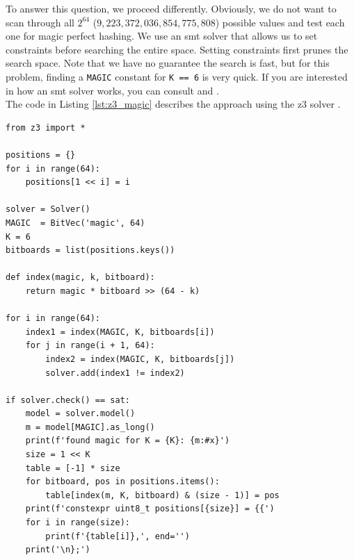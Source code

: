 \documentclass[12pt,a4paper,twoside,openright]{book}
\begin{document}
To answer this question, we proceed differently. Obviously, we do not want to scan through all $2^{64}$ ($9, 223, 372, 036, 854, 775, 808$) possible values and test each one for magic perfect hashing. We use an \gls{smt} solver that allows us to set constraints before searching the entire space. Setting constraints first prunes the search space. Note that we have no guarantee the search is fast, but for this problem, finding a \texttt{MAGIC} constant for \texttt{K == 6} is very quick. If you are interested in how an \gls{smt} solver works, you can consult \cite{kroening2016decision} and \cite{biere2021handbook}.\\

The code in Listing \ref{lst:z3_magic} describes the approach using the \gls{z3} solver \cite{moura2008z3}.

\begin{mdframed}[skipabove=\baselineskip,hidealllines=true]
\begin{verbatim}
from z3 import *

positions = {}
for i in range(64):
    positions[1 << i] = i

solver = Solver()
MAGIC  = BitVec('magic', 64)
K = 6
bitboards = list(positions.keys())

def index(magic, k, bitboard):
    return magic * bitboard >> (64 - k)

for i in range(64):
    index1 = index(MAGIC, K, bitboards[i])
    for j in range(i + 1, 64):
        index2 = index(MAGIC, K, bitboards[j])
        solver.add(index1 != index2)

if solver.check() == sat:
    model = solver.model()
    m = model[MAGIC].as_long()
    print(f'found magic for K = {K}: {m:#x}')
    size = 1 << K
    table = [-1] * size
    for bitboard, pos in positions.items():
        table[index(m, K, bitboard) & (size - 1)] = pos
    print(f'constexpr uint8_t positions[{size}] = {{')
    for i in range(size):
        print(f'{table[i]},', end='')
    print('\n};')
\end{verbatim}
\label{lst:z3_magic}
\end{mdframed}
\end{document}
